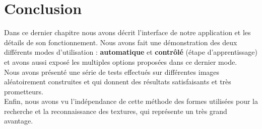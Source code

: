 \section{Conclusion}
\indent Dans ce dernier chapitre nous avons décrit l'interface de notre application et les détails de son fonctionnement. Nous avons fait une démonstration des deux différents modes d'utilisation : \textbf{automatique} et \textbf{contrôlé} (étape d'apprentissage) et avons aussi exposé les multiples options proposées dans ce dernier mode.\\
\indent Nous avons présenté une série de tests effectués sur différentes images aléatoirement construites et qui donnent des résultats satisfaisants et très prometteurs.\\
\indent Enfin, nous avons vu l'indépendance de cette méthode des formes utilisées pour la recherche et la reconnaissance des textures, qui représente un très grand avantage.
